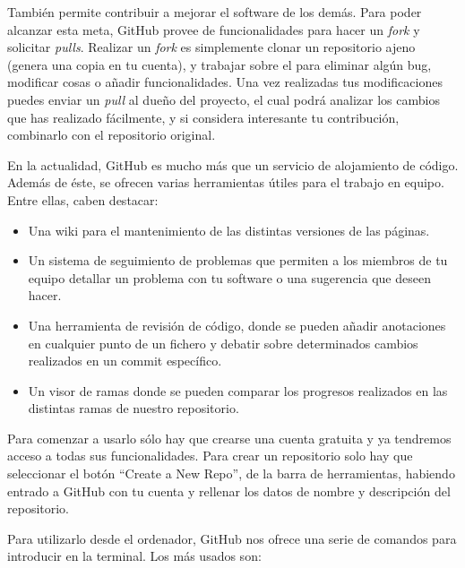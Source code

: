 También permite contribuir a mejorar el software de los demás. Para poder alcanzar esta meta, GitHub provee de funcionalidades para hacer un \textit{fork} y solicitar \textit{pulls}. Realizar un \textit{fork} es simplemente clonar un repositorio ajeno (genera una copia en tu cuenta), y trabajar sobre el para eliminar algún bug, modificar cosas o añadir funcionalidades. Una vez realizadas tus modificaciones puedes enviar un \textit{pull} al dueño del proyecto, el cual podrá analizar los cambios que has realizado fácilmente, y si considera interesante tu contribución, combinarlo con el repositorio original.

En la actualidad, GitHub es mucho más que un servicio de alojamiento de código. Además de éste, se ofrecen varias herramientas útiles para el trabajo en equipo. Entre ellas, caben destacar:
\begin{itemize}
	\item Una wiki para el mantenimiento de las distintas versiones de las páginas.
	\item Un sistema de seguimiento de problemas que permiten a los miembros de tu equipo detallar un problema con tu software o una sugerencia que deseen hacer.
	\item Una herramienta de revisión de código, donde se pueden añadir anotaciones en cualquier punto de un fichero y debatir sobre determinados cambios realizados en un commit específico.
	\item Un visor de ramas donde se pueden comparar los progresos realizados en las distintas ramas de nuestro repositorio.
\end{itemize}

Para comenzar a usarlo sólo hay que crearse una cuenta gratuita y ya tendremos acceso a todas sus funcionalidades. Para crear un repositorio solo hay que seleccionar el botón “Create a New Repo”, de la barra de herramientas, habiendo entrado a GitHub con tu cuenta y rellenar los datos de nombre y descripción del repositorio.

Para utilizarlo desde el ordenador, GitHub nos ofrece una serie de comandos para introducir en la terminal. Los más usados son:


